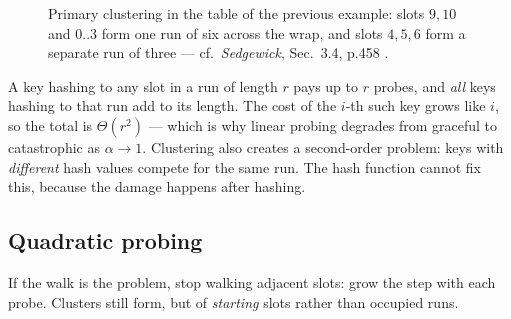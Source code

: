 \documentclass[11pt]{article}
\begin{document}
\begin{figure}[h]
  \centering
  \caption{Primary clustering in the table of the previous example: slots $9,10$ and $0..3$ form one run of six across the wrap, and slots $4,5,6$ form a separate run of three --- cf.\ \textit{Sedgewick}, Sec.~3.4, p.458 \cite{Sedgewick2011_algorithms}.}
\end{figure}

A key hashing to any slot in a run of length $r$ pays up to $r$ probes, and \emph{all} keys hashing to that run add to its length. The cost of the $i$-th such key grows like $i$, so the total is $\Theta(r^2)$ --- which is why linear probing degrades from graceful to catastrophic as $\alpha \to 1$. Clustering also creates a second-order problem: keys with \emph{different} hash values compete for the same run. The hash function cannot fix this, because the damage happens after hashing.

\subsection{Quadratic probing}

If the walk is the problem, stop walking adjacent slots: grow the step with each probe. Clusters still form, but of \emph{starting} slots rather than occupied runs.
\end{document}
